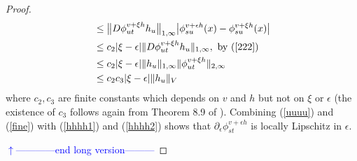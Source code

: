 \documentclass[noinfoline]{imsart}
\begin{document}
\begin{proof}
{\begin{align}
  &\leq   \bigl\| D\phi^{v+\xi h}_{ut} h_u \bigr\|_{1,\infty} \bigl| \phi^{v+\epsilon h}_{su}(x)-  \phi^{ v+\xi h}_{su}(x)  \bigr| \nonumber   \\
 &\leq  c_2 |\xi -\epsilon|  \| D\phi^{v+\xi h}_{ut} h_u \|_{1,\infty} ,\,\,\text{by (\ref{222})} \nonumber   \\
&\leq  c_2 |\xi -\epsilon|   \| h_u \|_{1,\infty} \| \phi^{v+\xi h}_{ut} \|_{2,\infty}  \nonumber   \\
&\leq  c_2 c_3|\xi -\epsilon|   \| h_u \|_{V}   \label{fine}
\end{align}
where $c_2, c_3$  are finite constants which depends on $v$ and $h$ but not on   $\xi$ or $\epsilon$ (the existence of $c_3$ follows again from  Theorem 8.9 of \cite{you:10}). Combining (\ref{uuuu}) and (\ref{fine}) with (\ref{hhhh1}) and (\ref{hhhh2}) shows that $ \partial_\epsilon  \phi^{ v+\epsilon h}_{st}$  is locally Lipschitz in $\epsilon$.

   {\flushleft\textcolor{blue}{$\uparrow$------------end long version---------}}\newline
} \fi





\end{proof}
\end{document}
